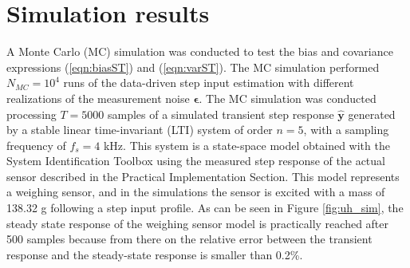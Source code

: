 \section{Simulation results} 

A Monte Carlo (MC) simulation was conducted to test the bias and covariance expressions (\ref{eqn:biasST}) and (\ref{eqn:varST}).
The MC simulation performed $N_{MC} = 10^4$ runs of the data-driven step input estimation with different realizations of the measurement noise $\bm{\epsilon}$.
The MC simulation was conducted processing $T = 5000$ samples of a simulated transient step response $\widehat{\mathbf{y}}$ generated by a stable linear time-invariant (LTI) system of order $n = 5$, with a sampling frequency of $f_s=4$ kHz.
This system is a state-space model obtained with the System Identification Toolbox using the measured step response of the actual sensor described in the Practical Implementation Section.
This model represents a weighing sensor, and in the simulations the sensor is excited with a mass of 138.32 g following a step input profile. 
As can be seen in Figure \ref{fig:uh_sim}, the steady state response of the weighing sensor model is practically reached after 500 samples because from there on the relative error between the transient response and the steady-state response is smaller than 0.2\%.

